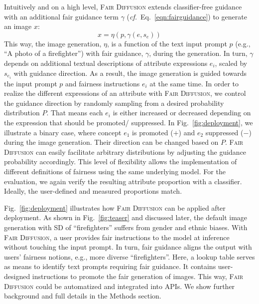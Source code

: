 \documentclass{article}%
\newcommand{\cf}{\emph{cf.}~}
\begin{document}
Intuitively and on a high level, \textsc{Fair Diffusion} extends classifier-free guidance \cite{ho2022classifier} with an additional fair guidance term $\gamma$ (\cf Eq.~\ref{eqn:fairguidance}) to generate an image $x$:
\begin{equation}
x = \eta(p,\gamma(e,s_e))
\end{equation}
This way, the image generation, $\eta$, is a function of the text input prompt $p$ (e.g., ``A photo of a firefighter'') with fair guidance, $\gamma$, during the generation. In turn, $\gamma$ depends on additional textual descriptions of attribute expressions $e_i$, scaled by $s_{e_i}$ with guidance direction. As a result, the image generation is guided towards the input prompt $p$ and fairness instructions $e_i$ at the same time.
In order to realize the different expressions of an attribute with \textsc{Fair Diffusion}, we control the guidance direction by randomly sampling from a desired probability distribution $P$. That means each $e_i$ is either increased or decreased depending on the expression that should be promoted/ suppressed. In Fig.~\ref{fig:deployment}, we illustrate a binary case, where concept $e_1$ is promoted ($+$) and $e_2$ suppressed ($-$) during the image generation. Their direction can be changed based on $P$.
% 
\textsc{Fair Diffusion} can easily facilitate arbitrary distributions by adjusting the guidance probability accordingly. This level of flexibility allows the implementation of different definitions of fairness using the same underlying model. For the evaluation, we again verify the resulting attribute proportion with a classifier. Ideally, the user-defined and measured proportions match.

Fig.~\ref{fig:deployment} illustrates how \textsc{Fair Diffusion} can be applied after deployment. As shown in Fig.~\ref{fig:teaser} and discussed later, the default image generation with SD of ``firefighters'' suffers from gender and ethnic biases. With \textsc{Fair Diffusion}, a user provides fair instructions to the model at inference without touching the input prompt. In turn, fair guidance aligns the output with users' fairness notions, e.g., more diverse ``firefighters''.
Here, a lookup table serves as means to identify text prompts requiring fair guidance. It contains user-designed instructions to promote the fair generation of images. This way, \textsc{Fair Diffusion} could be automatized and integrated into APIs. We show further background and full details in the Methods section.
\end{document}
